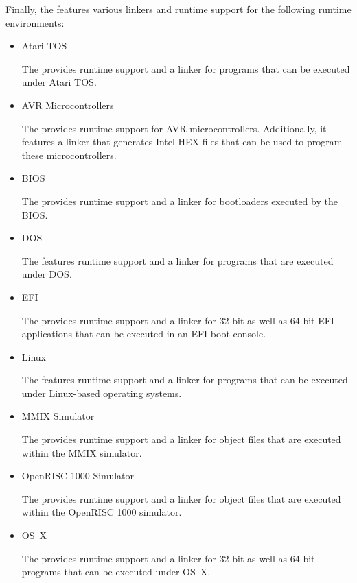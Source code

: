 Finally, the \ecs{} features various linkers and runtime support for the following runtime environments:

\begin{itemize}

\item Atari TOS\nopagebreak

The \ecs{} provides runtime support and a linker for programs that can be executed under Atari TOS\@.

\item AVR Microcontrollers\nopagebreak

The \ecs{} provides runtime support for AVR microcontrollers.
Additionally, it features a linker that generates Intel HEX files that can be used to program these microcontrollers.

\item BIOS\nopagebreak

The \ecs{} provides runtime support and a linker for bootloaders executed by the BIOS\@.

\item DOS\nopagebreak

The \ecs{} features runtime support and a linker for programs that are executed under DOS\@.

\item EFI\nopagebreak

The \ecs{} provides runtime support and a linker for 32-bit as well as 64-bit EFI applications that can be executed in an EFI boot console.

\item Linux\nopagebreak

The \ecs{} features runtime support and a linker for programs that can be executed under Linux-based operating systems.

\item MMIX Simulator\nopagebreak

The \ecs{} provides runtime support and a linker for object files that are executed within the MMIX simulator.

\item OpenRISC 1000 Simulator\nopagebreak

The \ecs{} provides runtime support and a linker for object files that are executed within the OpenRISC 1000 simulator.

\item OS~X\nopagebreak

The \ecs{} provides runtime support and a linker for 32-bit as well as 64-bit programs that can be executed under OS~X\@.


\end{itemize}
